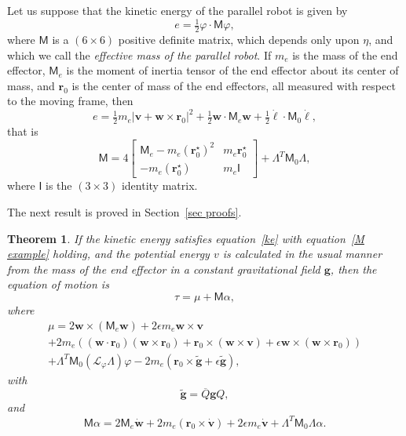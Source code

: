 \documentclass[reqno,12pt]{amsart}
\newcommand\starop[1]{#1^\star}
\newcommand{\liederiv}{\mathcal L}
\newtheorem{theorem}{Theorem}
\begin{document}
Let us suppose that the kinetic energy of the parallel robot is given by
\begin{equation}
\label{ke}
e = \tfrac12 \varphi \cdot \mathsf M \varphi,
\end{equation}
where $\mathsf M$ is a $(6 \times 6)$ positive definite matrix, which depends only upon $\eta$, and which we call the \emph{effective mass of the parallel robot}.  If $m_e$ is the mass of the end effector, $\mathsf M_e$ is the moment of inertia tensor of the end effector about its center of mass, and $\bm r_0$ is the center of mass of the end effectors, all measured with respect to the moving frame, then
\begin{equation}
e = \tfrac12 m_e |\bm v + \bm w \times \bm r_0|^2 + \tfrac12 \bm w \cdot \mathsf M_e \bm w + \tfrac12 \dot{\bm\ell} \cdot \mathsf M_0 \dot{\bm\ell} , 
\end{equation}
that is
\begin{equation}
\label{M example}
\mathsf M = 4 \begin{bmatrix} \mathsf M_e - m_e (\starop{\bm r_0})^2 & m_e \starop{\bm r_0} \\ - m_e (\starop{\bm r_0}) & m_e \mathsf I \end{bmatrix} + \mathsf\Lambda^T \mathsf M_0 \mathsf\Lambda,
\end{equation}
where $\mathsf I$ is the $(3 \times 3)$ identity matrix.

The next result is proved in Section~\ref{sec proofs}.

\begin{theorem}
\label{equation of motion}
If the kinetic energy satisfies equation~\eqref{ke} with equation~\eqref{M example} holding, and the potential energy $v$ is calculated in the usual manner from the mass of the end effector in a constant gravitational field $\bm g$, then the equation of motion is
\begin{equation}
\tau = \mu + \mathsf M \alpha,
\end{equation}
where
\begin{multline}
\label{tau example}
\mu = 2\bm w \times (\mathsf M_e \bm w) + 2\epsilon m_e \bm w \times \bm v \\
+ 2 m_e ((\bm w \cdot \bm r_0) (\bm w \times \bm r_0) + \bm r_0 \times (\bm w \times \bm v) + \epsilon \bm w \times (\bm w \times \bm r_0)) \\
+ \mathsf \Lambda^T \mathsf M_0 (\liederiv_\varphi \mathsf \Lambda) \varphi 
- 2 m_e (\bm r_0 \times \tilde{\bm g} + \epsilon \tilde{\bm g}) ,
\end{multline}
with
\begin{equation}
\tilde{\bm g} = \overline Q \bm g Q ,
\end{equation}
and
\begin{equation}
\mathsf M \alpha = 2 \mathsf M_e \dot{\bm w} + 2 m_e (\bm r_0 \times \dot{\bm v}) + 2 \epsilon m_e \dot{\bm v} + \mathsf\Lambda^T \mathsf M_0 \mathsf \Lambda \alpha.
\end{equation}
\end{theorem}
\end{document}
